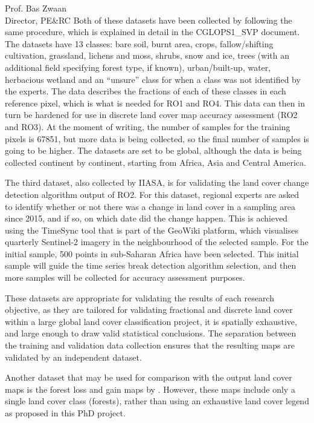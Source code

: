 \documentclass[a4paper,10pt,backaddress=false]{scrartcl}
\begin{document}
\begin{letter}{Prof. Bas Zwaan \\ Director, PE\&RC}
Both of these datasets have been collected by following the same procedure, which is explained in detail in the CGLOPS1\_SVP document. The datasets have 13 classes: bare soil, burnt area, crops, fallow/shifting cultivation, grassland, lichens and moss, shrubs, snow and ice, trees (with an additional field specifying forest type, if known), urban/built-up, water, herbacious wetland and an ``unsure'' class for when a class was not identified by the experts. The data describes the fractions of each of these classes in each reference pixel, which is what is needed for RO1 and RO4. This data can then in turn be hardened for use in discrete land cover map accuracy assessment (RO2 and RO3). At the moment of writing, the number of samples for the training pixels is 67851, but more data is being collected, so the final number of samples is going to be higher. The datasets are set to be global, although the data is being collected continent by continent, starting from Africa, Asia and Central America.

The third dataset, also collected by IIASA, is for validating the land cover change detection algorithm output of RO2. For this dataset, regional experts are asked to identify whether or not there was a change in land cover in a sampling area since 2015, and if so, on which date did the change happen. This is achieved using the TimeSync tool that is part of the GeoWiki platform, which visualises quarterly Sentinel-2 imagery in the neighbourhood of the selected sample. For the initial sample, 500 points in sub-Saharan Africa have been selected. This initial sample will guide the time series break detection algorithm selection, and then more samples will be collected for accuracy assessment purposes.

These datasets are appropriate for validating the results of each research objective, as they are tailored for validating fractional and discrete land cover within a large global land cover classification project, it is spatially exhaustive, and large enough to draw valid statistical conclusions. The separation between the training and validation data collection ensures that the resulting maps are validated by an independent dataset.

Another dataset that may be used for comparison with the output land cover maps is the forest loss and gain maps by \citet{hansen_high-resolution_2013}. However, these maps include only a single land cover class (forests), rather than using an exhaustive land cover legend as proposed in this PhD project.


\end{letter}
\end{document}
